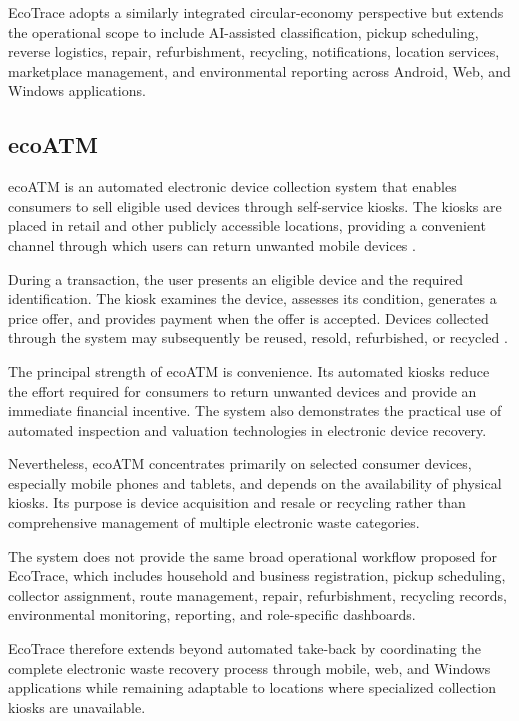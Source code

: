 EcoTrace adopts a similarly integrated circular-economy perspective but
extends the operational scope to include AI-assisted classification, pickup
scheduling, reverse logistics, repair, refurbishment, recycling, notifications,
location services, marketplace management, and environmental reporting across
Android, Web, and Windows applications.

\subsection{ecoATM}

ecoATM is an automated electronic device collection system that enables
consumers to sell eligible used devices through self-service kiosks. The kiosks are
placed in retail and other publicly accessible locations, providing a convenient
channel through which users can return unwanted mobile devices
\citep{ecoatm2026a}.

During a transaction, the user presents an eligible device and the required
identification. The kiosk examines the device, assesses its condition, generates a
price offer, and provides payment when the offer is accepted. Devices collected
through the system may subsequently be reused, resold, refurbished, or recycled
\citep{ecoatm2026b}.

The principal strength of ecoATM is convenience. Its automated kiosks reduce
the effort required for consumers to return unwanted devices and provide an
immediate financial incentive. The system also demonstrates the practical use of
automated inspection and valuation technologies in electronic device recovery.

Nevertheless, ecoATM concentrates primarily on selected consumer devices,
especially mobile phones and tablets, and depends on the availability of physical
kiosks. Its purpose is device acquisition and resale or recycling rather than
comprehensive management of multiple electronic waste categories.

The system does not provide the same broad operational workflow proposed
for EcoTrace, which includes household and business registration, pickup
scheduling, collector assignment, route management, repair, refurbishment,
recycling records, environmental monitoring, reporting, and role-specific
dashboards.

EcoTrace therefore extends beyond automated take-back by coordinating the
complete electronic waste recovery process through mobile, web, and Windows
applications while remaining adaptable to locations where specialized collection
kiosks are unavailable.

